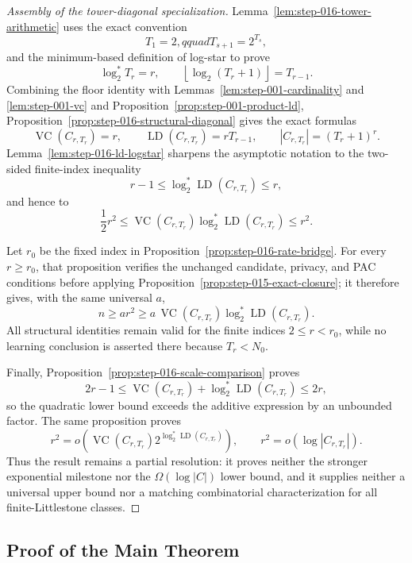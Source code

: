 \begin{proof}[Assembly of the tower-diagonal specialization]
Lemma~\ref{lem:step-016-tower-arithmetic} uses the exact convention
\[
T_1=2,qquad T_{s+1}=2^{T_s},
\]
and the minimum-based definition of log-star to
prove
\[
\log_2^*T_r=r,
\qquad
\left\lfloor\log_2(T_r+1)\right\rfloor=T_{r-1}.
\]
Combining the floor identity with Lemmas~\ref{lem:step-001-cardinality} and
\ref{lem:step-001-vc} and
Proposition~\ref{prop:step-001-product-ld},
Proposition~\ref{prop:step-016-structural-diagonal} gives the exact formulas
\[
\operatorname{VC}(C_{r,T_r})=r,
\qquad
\operatorname{LD}(C_{r,T_r})=rT_{r-1},
\qquad
|C_{r,T_r}|=(T_r+1)^r.
\]
Lemma~\ref{lem:step-016-ld-logstar} sharpens the asymptotic notation to the
two-sided finite-index inequality
\[
r-1\le
\log_2^*\operatorname{LD}(C_{r,T_r})
\le r,
\]
and hence to
\[
\frac12r^2\le
\operatorname{VC}(C_{r,T_r})
\log_2^*\operatorname{LD}(C_{r,T_r})
\le r^2.
\]

Let $r_0$ be the fixed index in
Proposition~\ref{prop:step-016-rate-bridge}.  For every $r\ge r_0$, that
proposition verifies the unchanged candidate, privacy, and PAC conditions
before applying Proposition~\ref{prop:step-015-exact-closure}; it therefore
gives, with the same universal $a$,
\[
n\ge ar^2
\ge a\,\operatorname{VC}(C_{r,T_r})
       \log_2^*\operatorname{LD}(C_{r,T_r}).
\]
All structural identities remain valid for the finite indices
$2\le r<r_0$, while no learning conclusion is asserted there because
$T_r<N_0$.

Finally, Proposition~\ref{prop:step-016-scale-comparison} proves
\[
2r-1\le
\operatorname{VC}(C_{r,T_r})+
\log_2^*\operatorname{LD}(C_{r,T_r})
\le2r,
\]
so the quadratic lower bound exceeds the additive expression by an
unbounded factor.  The same proposition proves
\[
r^2=o\!\left(
\operatorname{VC}(C_{r,T_r})
2^{\log_2^*\operatorname{LD}(C_{r,T_r})}
\right),
\qquad
r^2=o(\log|C_{r,T_r}|).
\]
Thus the result remains a partial resolution: it proves neither the
stronger exponential milestone nor the $\Omega(\log|C|)$ lower bound,
and it supplies neither a universal upper bound nor a matching
combinatorial characterization for all finite-Littlestone classes.
\end{proof}

\subsection{Proof of the Main Theorem}\label{app:main-proof}

